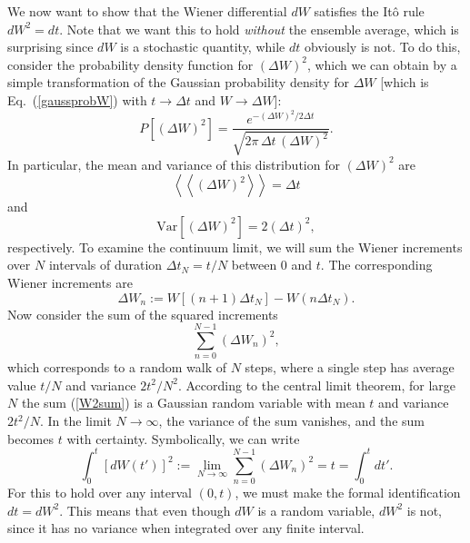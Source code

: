 \documentclass[12pt,aps,onecolum,superscriptaddress,footinbib,floatfix,showpacs]{revtex4-1}
\newcommand{\dlangle}{\left\langle\!\left\langle}
\newcommand{\drangle}{\right\rangle\!\right\rangle}
\def\dexpct#1{\dlangle{#1}\drangle}
\begin{document}
We now want to show that the Wiener differential $dW$ satisfies 
the It\^o rule $dW^2=dt$.  Note that we want this to hold 
\textit{without} the ensemble average, which is surprising since
$dW$ is a stochastic quantity, while $dt$ obviously is not.
To do this, consider the probability density function for $(\Delta W)^2$,
which we can obtain by a simple transformation of the Gaussian
probability density for $\Delta W$ [which is Eq.~(\ref{gaussprobW})
with $t\longrightarrow\Delta t$ and $W\longrightarrow\Delta W$]:
\begin{equation}
  P\left[(\Delta W)^2\right] = 
   \frac{e^{-(\Delta W)^2/2\Delta t}}{\sqrt{2\pi\,\Delta t\,(\Delta W)^2}}.
\end{equation}
In particular, the mean and variance of this distribution for $(\Delta W)^2$ are
\begin{equation}
  \dexpct{(\Delta W)^2} = \Delta t
\end{equation}
and 
\begin{equation}
  \textrm{Var}\left[(\Delta W)^2\right] = 2(\Delta t)^2,
\end{equation}
respectively.
To examine the continuum limit, we will sum the Wiener increments over
$N$ intervals of duration $\Delta t_N = t/N$ between $0$ and $t$. 
The corresponding Wiener increments are
\begin{equation}
  \Delta W_n := W[(n+1)\Delta t_N] - W(n\Delta t_N).
\end{equation}
Now consider the sum of the squared increments
\begin{equation}
  \sum_{n=0}^{N-1}(\Delta W_n)^2,
  \label{W2sum}
\end{equation}
which corresponds to a random walk of $N$ steps, where a single
step has average value $t/N$ and variance $2t^2/N^2$.
According to the central limit theorem, for large $N$ the
sum (\ref{W2sum}) is a Gaussian random variable with mean $t$ and
variance $2t^2/N$.
In the limit $N\longrightarrow \infty$, the variance of the
sum vanishes, and the sum becomes $t$ with certainty.
Symbolically, we can write
\begin{equation}
  \int_0^t [dW(t')]^2 :=\lim_{N\rightarrow\infty}\sum_{n=0}^{N-1}
     (\Delta W_n)^2 = t = \int_0^t dt'.
\end{equation}
For this to hold over any interval $(0,t)$, we must make the 
formal identification $dt=dW^2$.
This means that even though $dW$ is a random variable, $dW^2$ is not,
since it has no variance when integrated over any finite interval.
\end{document}
